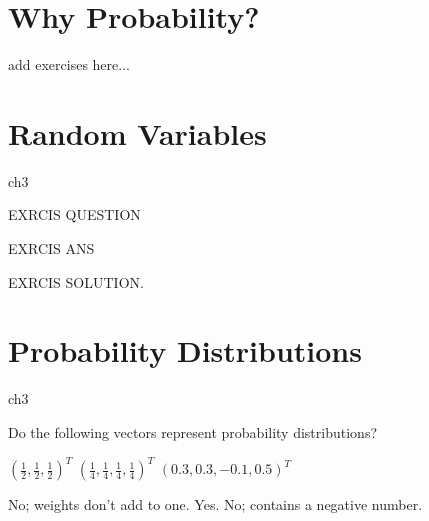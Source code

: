 
\section{Why Probability?}

add exercises here...

\section{Random Variables}

\begin{exercises}{ch3}

	\begin{exercise} 
		EXRCIS  QUESTION

		\begin{eanswer}EXRCIS  ANS\end{eanswer}
		\begin{esolution}
			EXRCIS SOLUTION.
		\end{esolution}
	\end{exercise}


\end{exercises}

\section{Probability Distributions}

\begin{exercises}{ch3}

	\begin{exercise} 
		Do the following vectors represent probability distributions?
		\begin{exparts*}
			\partsitem	$\left(\tfrac{1}{2}, \tfrac{1}{2}, \tfrac{1}{2} \right)^T$
			\partsitem	$\left(\tfrac{1}{4}, \tfrac{1}{4}, \tfrac{1}{4}, \tfrac{1}{4} \right)^T$
			\partsitem	$\left(0.3, 0.3, -0.1, 0.5  \right)^T$
		\end{exparts*}

		\begin{eanswer}\begin{ansparts*}
					\partsitem No; weights don't add to one.
					\partsitem Yes.
					\partsitem No; contains a negative number.
					\end{ansparts*}\end{eanswer}
	\end{exercise}


\end{exercises}






